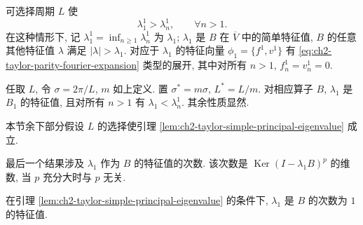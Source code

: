 \begin{Lemma}
\label{lem:ch2-taylor-simple-principal-eigenvalue}
可选择周期 $L$ 使
\[
\lambda_1^1>\lambda_n^1,
\qquad\forall n>1.
\]
在这种情形下, 记 $\lambda_1^1=\inf_{n\geq1}\lambda_n^1$ 为 $\lambda_1$; $\lambda_1$ 是 $B$ 在 $\overline V$ 中的简单特征值, $B$ 的任意其他特征值 $\lambda$ 满足 $|\lambda|>\lambda_1$. 对应于 $\lambda_1$ 的特征向量 $\phi_1=\{f^1,v^1\}$ 有 \eqref{eq:ch2-taylor-parity-fourier-expansion} 类型的展开, 其中对所有 $n>1$, $f_n^1=v_n^1=0$.
\end{Lemma}

\begin{Proof}
任取 $L$, 令 $\sigma=2\pi/L$, $m$ 如上定义. 置 $\sigma^*=m\sigma$, $L^*=L/m$. 对相应算子 $B$, $\lambda_1$ 是 $B_1$ 的特征值, 且对所有 $n>1$ 有 $\lambda_1<\lambda_n^1$. 其余性质显然.
\end{Proof}

本节余下部分假设 $L$ 的选择使引理 \ref{lem:ch2-taylor-simple-principal-eigenvalue} 成立.

最后一个结果涉及 $\lambda_1$ 作为 $B$ 的特征值的次数. 该次数是 $\operatorname{Ker}(I-\lambda_1B)^p$ 的维数, 当 $p$ 充分大时与 $p$ 无关.

\begin{Lemma}
\label{lem:ch2-taylor-principal-degree-one}
在引理 \ref{lem:ch2-taylor-simple-principal-eigenvalue} 的条件下, $\lambda_1$ 是 $B$ 的次数为 $1$ 的特征值.
\end{Lemma}


